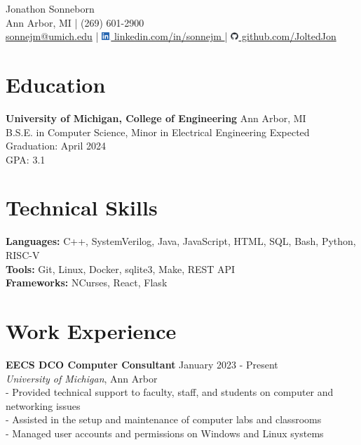 \documentclass[letterpaper,11pt]{article}
\begin{document}
\begin{center}
  {\Huge Jonathon Sonneborn} \\
  \vspace{2pt}
  Ann Arbor, MI \quad | \quad (269) 601-2900 \\
  \small \href{mailto:sonnejm@umich.edu}{sonnejm@umich.edu} \quad | \quad
  \href{https://www.linkedin.com/in/sonnejm/}{
    \includegraphics[height=0.3cm]{images/LI-In-Bug.png}
    linkedin.com/in/sonnejm
  } \quad | \quad
  \href{https://github.com/joltedjon}{
    \includegraphics[height=0.3cm]{images/github-mark.png}
    github.com/JoltedJon
  } \\
  \vspace{6pt}
\end{center}

\section*{Education}
\textbf{University of Michigan, College of Engineering} \hfill Ann Arbor, MI \\
B.S.E. in Computer Science, Minor in Electrical Engineering \hfill Expected Graduation: April 2024 \\
GPA: 3.1

\section*{Technical Skills}
\textbf{Languages:} C++, SystemVerilog, Java, JavaScript, HTML, SQL, Bash, Python, RISC-V \\
\textbf{Tools:} Git, Linux, Docker, sqlite3, Make, REST API \\
\textbf{Frameworks:} NCurses, React, Flask

\section*{Work Experience}
\textbf{EECS DCO Computer Consultant} \hfill January 2023 - Present \\
\textit{University of Michigan}, Ann Arbor \\
- Provided technical support to faculty, staff, and students on computer and networking issues \\
- Assisted in the setup and maintenance of computer labs and classrooms \\
- Managed user accounts and permissions on Windows and Linux systems
\end{document}
